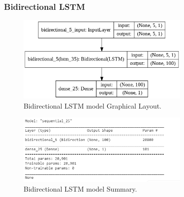 \documentclass[12pt]{report}
\begin{document}
\subsubsection{Bidirectional LSTM}


\begin{figure}[H]%
\begin {center}
\includegraphics[width=0.75\textwidth]{Bidirectional.png}
\caption{Bidirectional LSTM model Graphical Layout.}
\label{fig:ecg}
\end {center}
\end{figure}

\begin{figure}[H]%
\begin {center}
\includegraphics[width=0.75\textwidth]{Bidirectional1.png}
\caption{Bidirectional LSTM model Summary.}
\label{fig:ecg}
\end {center}
\end{figure}
\end{document}
